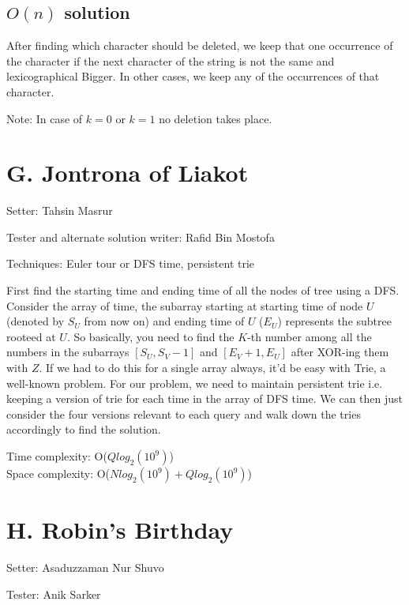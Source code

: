 \documentclass{article}
\begin{document}
\subsection*{$O(n)$ solution}
After finding which character should be deleted, we keep that one occurrence of the character if the next character of the string is not the same and lexicographical Bigger. In other cases, we keep any of the occurrences of that
character.

Note: In case of $k=0$ or $k=1$ no deletion takes place.

\section*{G. Jontrona of Liakot}

\noindent Setter: Tahsin Masrur

\noindent Tester and alternate solution writer: Rafid Bin Mostofa

\noindent Techniques: Euler tour or DFS time, persistent trie

\vspace{0.5cm}

First find the starting time and ending time of all the nodes of tree using a DFS. Consider the array of time, the subarray starting at starting time of node $U$ (denoted by $S_U$ from now on) and ending time of $U$ ($E_U$) represents the subtree rooteed at $U$. So basically, you need to find the $K$-th number among all the numbers in the subarrays $[S_U, S_V-1]$ and $[E_V+1, E_U]$ after XOR-ing them with $Z$. If we had to do this for a single array always, it'd be easy with Trie, a well-known problem. For our problem, we need to maintain persistent trie i.e. keeping a version of trie for each time in the array of DFS time. We can then just consider the four versions relevant to each query and walk down the tries accordingly to find the solution.

\vspace{0.5cm}
\noindent Time complexity: O($Qlog_2(10^9)$)\\
\noindent Space complexity: O($Nlog_2(10^9) + Qlog_2(10^9)$)

\section*{H. Robin's Birthday}

\noindent Setter: Asaduzzaman Nur Shuvo

\noindent Tester: Anik Sarker
\end{document}
